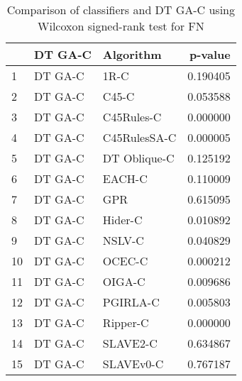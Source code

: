\begin{table}
\footnotesize
\caption{Comparison of classifiers and DT GA-C using Wilcoxon signed-rank test for FN}
\label{tab:DT GA-C wilcoxon FN comparison}
\begin{tabular}{lllr}
\hline
 & DT GA-C & Algorithm & p-value \\
\hline
1 & DT GA-C & 1R-C & 0.190405 \\
2 & DT GA-C & C45-C & 0.053588 \\
3 & DT GA-C & C45Rules-C & 0.000000 \\
4 & DT GA-C & C45RulesSA-C & 0.000005 \\
5 & DT GA-C & DT Oblique-C & 0.125192 \\
6 & DT GA-C & EACH-C & 0.110009 \\
7 & DT GA-C & GPR & 0.615095 \\
8 & DT GA-C & Hider-C & 0.010892 \\
9 & DT GA-C & NSLV-C & 0.040829 \\
10 & DT GA-C & OCEC-C & 0.000212 \\
11 & DT GA-C & OIGA-C & 0.009686 \\
12 & DT GA-C & PGIRLA-C & 0.005803 \\
13 & DT GA-C & Ripper-C & 0.000000 \\
14 & DT GA-C & SLAVE2-C & 0.634867 \\
15 & DT GA-C & SLAVEv0-C & 0.767187 \\
\hline
\end{tabular}
\end{table}
